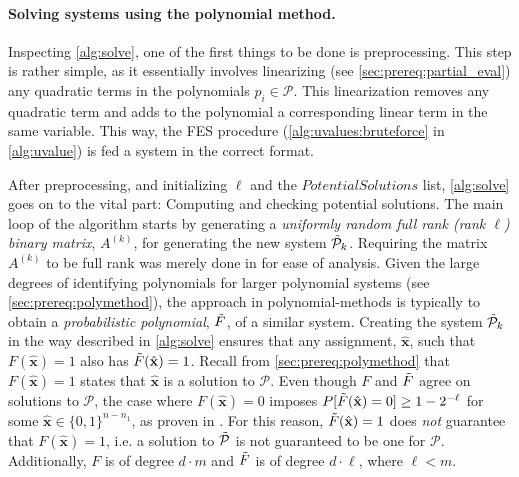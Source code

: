 \paragraph{Solving systems using the polynomial method.} Inspecting \cref{alg:solve}, one of the first things to be done is preprocessing. This step is rather simple, as it essentially involves linearizing (see \cref{sec:prereq:partial_eval}) any quadratic terms in the polynomials $p_i \in \mathcal{P}$. This linearization removes any quadratic term and adds to the polynomial a corresponding linear term in the same variable. This way, the FES procedure (\cref{alg:uvalues:bruteforce} in \cref{alg:uvalue}) is fed a system in the correct format.

After preprocessing, and initializing $\ell$ and the $PotentialSolutions$ list, \cref{alg:solve} goes on to the vital part: Computing and checking potential solutions. The main loop of the algorithm starts by generating a \textit{uniformly random full rank (rank $\ell$) binary matrix}, $A^{(k)}$, for generating the new system $\Tilde{\mathcal{P}}_k$. Requiring the matrix $A^{(k)}$ to be full rank was merely done in \cite{eurocrypt-2021-30841} for ease of analysis. Given the large degrees of identifying polynomials for larger polynomial systems (see \cref{sec:prereq:polymethod}), the approach in polynomial-methods is typically to obtain a \textit{probabilistic polynomial}, $\Tilde{F}$, of a similar system. Creating the system $\Tilde{\mathcal{P}}_k$ in the way described in \cref{alg:solve} ensures that any assignment, $\hat{\mathbf{x}}$, such that $F(\hat{\mathbf{x}}) = 1$ also has $\Tilde{F}(\hat{\mathbf{x}}) = 1$. Recall from \cref{sec:prereq:polymethod} that $F(\hat{\mathbf{x}}) = 1$ states that $\hat{\mathbf{x}}$ is a solution to $\mathcal{P}$. Even though $F$ and $\Tilde{F}$ agree on solutions to $\mathcal{P}$, the case where $F(\hat{\mathbf{x}}) = 0$ imposes $P[\Tilde{F}(\hat{\mathbf{x}}) = 0] \geq 1 - 2^{-\ell}$ for some $\hat{\mathbf{x}} \in \{0,1\}^{n - n_1}$, as proven in \cite{eurocrypt-2021-30841}. For this reason, $\Tilde{F}(\hat{\mathbf{x}}) = 1$ does \textit{not} guarantee that $F(\hat{\mathbf{x}}) = 1$, i.e. a solution to $\Tilde{\mathcal{P}}$ is not guaranteed to be one for $\mathcal{P}$. Additionally, $F$ is of degree $d \cdot m$ and $\Tilde{F}$ is of degree $d \cdot \ell$, where $\ell < m$.

